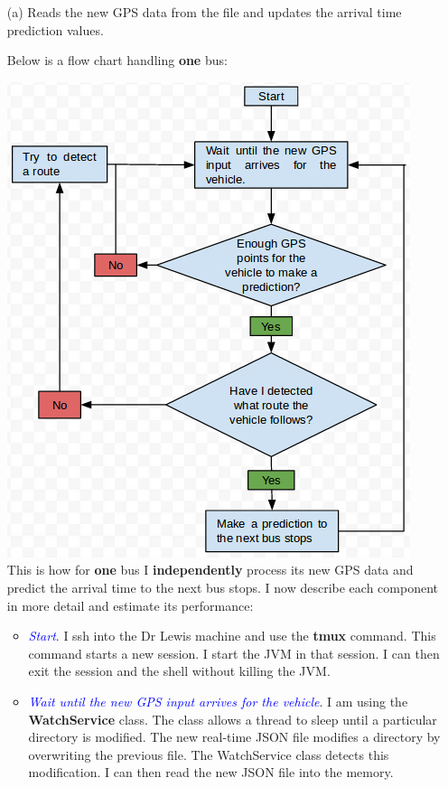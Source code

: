 \documentclass[12pt,a4paper,oneside,openright]{report}
\begin{document}
\begin{enumerate}

\item[(a)] Reads the new GPS data from the file and updates the arrival time
prediction values.

Below is a flow chart handling
\textbf{one} bus:

\includegraphics[scale = 0.6]{figs/flowchart.png} \\

This is how for \textbf{one} bus I \textbf{independently} process its new GPS data
and predict the arrival time to the next bus stops. I now describe each component in more detail
and estimate its performance:

\begin{itemize}

\item \textit{\textcolor{blue}{Start}}. I ssh into the Dr Lewis machine and use the \textbf{tmux} 
command. This command starts a new session. I start the JVM in that session. I can then exit the 
session and the shell without killing the JVM.

\item \textit{\textcolor{blue}{Wait until the new GPS input arrives for the vehicle}}. I am using the
\textbf{WatchService} class. The class allows a thread to sleep until a particular directory is 
modified. The new real-time JSON file modifies a directory by overwriting the previous file. The 
WatchService class detects this modification. I can then read the new JSON file into the memory.


\end{itemize}
\end{enumerate}
\end{document}
